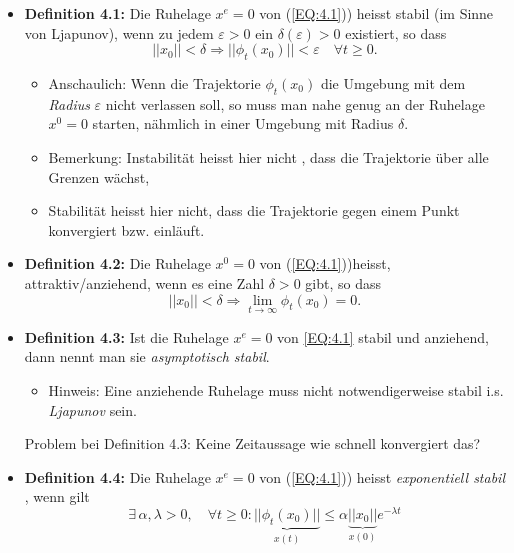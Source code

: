 \documentclass[11pt,a4paper]{article}
\begin{document}
\begin{itemize}
\item \textbf{Definition 4.1:} Die Ruhelage $x^e = 0$ von (\ref{EQ:4.1})) heisst stabil (im Sinne von Ljapunov), wenn zu jedem $\varepsilon > 0$ ein $\delta (\varepsilon) > 0$ existiert, so dass
\begin{equation*}
||x_0|| < \delta \Rightarrow ||\phi_t(x_0)||< \varepsilon \quad \forall t \ge 0.
\end{equation*}
\begin{figure}[H] 
  \centering 
  \def\svgwidth{350pt} 
   
\end{figure} 
\begin{itemize}
\item Anschaulich: Wenn die Trajektorie $\phi_t(x_0)$ die Umgebung mit dem \textit{Radius} $\varepsilon$ nicht verlassen soll, so muss man nahe genug an der Ruhelage $x^0 = 0 $ starten, nähmlich in einer Umgebung mit Radius $\delta$. 
\item Bemerkung: 
Instabilität heisst hier nicht , dass die Trajektorie über alle Grenzen wächst,
\item Stabilität heisst hier nicht, dass die Trajektorie gegen einem Punkt konvergiert bzw. einläuft.
\end{itemize}
\item \textbf{Definition 4.2:} Die Ruhelage $x^0 = 0$ von (\ref{EQ:4.1}))heisst, attraktiv/anziehend, wenn es eine Zahl $\delta > 0$ gibt, so dass
\begin{equation*}
||x_0|| < \delta \Rightarrow \lim \limits_{t\rightarrow \infty} \phi_t(x_0) = 0.
\end{equation*}
\item \textbf{Definition 4.3:} Ist die Ruhelage $x^e = 0$ von \ref{EQ:4.1} stabil und anziehend, dann nennt man sie \textit{asymptotisch stabil}.
\begin{itemize}
\item Hinweis: Eine anziehende Ruhelage muss nicht notwendigerweise stabil i.s. \textit{Ljapunov} sein.
\end{itemize}
\subitem Problem bei Definition 4.3: Keine Zeitaussage wie schnell konvergiert das?
\item \textbf{Definition 4.4: } Die Ruhelage $x^e = 0$ von (\ref{EQ:4.1})) heisst \textit{exponentiell stabil }, wenn gilt 
\begin{equation*}
\exists \, \alpha, \lambda > 0,\quad \forall t\ge 0: \underbrace{ || \phi_t(x_0) ||}_{x(t)} \le \alpha \underbrace{|| x_0 || }_{x(0)} e^{-\lambda t}

\end{equation*}
\end{itemize}
\end{document}
